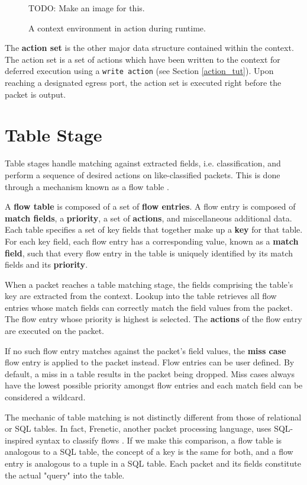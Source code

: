 \begin{figure}
TODO: Make an image for this.
\caption{A context environment in action during runtime.}
\label{fg:ContextEnvWorking}
\end{figure}

The \textbf{action set} is the other major data structure contained within the context. The action set is a set of actions which have been written to the context for deferred execution using a \texttt{write action} (see Section \ref{action_tut}). Upon reaching a designated egress port, the action set is executed right before the packet is output.

\section{Table Stage} \label{table_desc}

Table stages handle matching against extracted fields, i.e. classification, and perform a sequence of desired actions on like-classified packets. This is done through a mechanism known as a flow table \cite{openflow_spec}.

A \textbf{flow table} is composed of a set of \textbf{flow entries}. A flow entry is composed of \textbf{match fields}, a \textbf{priority}, a set of \textbf{actions}, and miscellaneous additional data. Each table specifies a set of key fields that together make up a \textbf{key} for that table. For each key field, each flow entry has a corresponding value, known as a \textbf{match field}, such that every flow entry in the table is uniquely identified by its match fields and its \textbf{priority}.

When a packet reaches a table matching stage, the fields comprising the table's key are extracted from the context. Lookup into the table retrieves all flow entries whose match fields can correctly match the field values from the packet. The flow entry whose priority is highest is selected. The \textbf{actions} of the flow entry are executed on the packet.

If no such flow entry matches against the packet's field values, the \textbf{miss case} flow entry is applied to the packet instead. Flow entries can be user defined. By default, a miss in a table results in the packet being dropped. Miss cases always have the lowest possible priority amongst flow entries and each match field can be considered a wildcard.

The mechanic of table matching is not distinctly different from those of relational or SQL tables. In fact, Frenetic, another packet processing language, uses SQL-inspired syntax to classify flows \cite{frenetic_paper1}. If we make this comparison, a flow table is analogous to a SQL table, the concept of a key is the same for both, and a flow entry is analogous to a tuple in a SQL table. Each packet and its fields constitute the actual "query" into the table.

